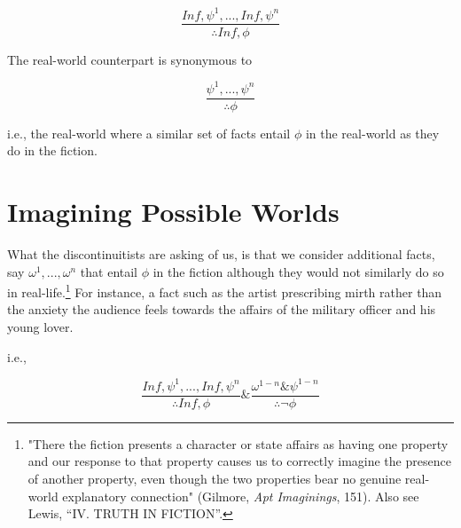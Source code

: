 \documentclass[phdthesis,12pt,final]{wuthesis}
\theoremstyle{definition}
\theoremstyle{definition}
\theoremstyle{definition}
\theoremstyle{definition}
\theoremstyle{remark}
\begin{document}
\[\frac{In f, \psi^{1}, . . ., In f, \psi^{n}}{\therefore In f, \phi}\]

\noindent The real-world counterpart is synonymous to

\[\frac{\psi^{1}, . . ., \psi^{n}}{\therefore\phi}\]

\noindent i.e., the real-world where a similar set of facts entail \(\phi\) in the real-world as they do in the fiction.

\section{Imagining Possible Worlds}\label{imagining-possible-worlds}

What the discontinuitists are asking of us, is that we consider additional facts, say \(\omega^{1}, . . ., \omega^{n}\) that entail \(\phi\) in the fiction although they would not similarly do so in real-life.\footnote{"There the fiction presents a character or state affairs as having one property and our response to that property causes us to correctly imagine the presence of another property, even though the two properties bear no genuine real-world explanatory connection" (Gilmore, \emph{Apt {Imaginings}}, 151). Also see Lewis, {``{IV}. {TRUTH IN FICTION}''}.} For instance, a fact such as the artist prescribing mirth rather than the anxiety the audience feels towards the affairs of the military officer and his young lover.

\noindent i.e.,

\[\frac{In f, \psi^{1}, . . ., In f, \psi^{n}}{\therefore In f, \phi} \& \frac{\omega^{1-n} \& \psi^{1-n}}{\therefore\neg\phi}\]
\end{document}
